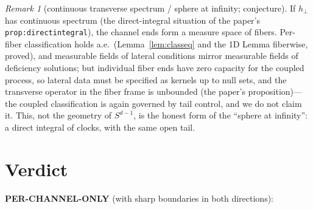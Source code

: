 \documentclass[11pt]{article}
\theoremstyle{remark}
\newtheorem{remark}[theorem]{Remark}
\begin{document}
\begin{remark}[continuous transverse spectrum / sphere at infinity;
conjecture]
If $h_{\perp}$ has continuous spectrum (the direct-integral situation
of the paper's \texttt{prop:directintegral}), the channel ends form a
measure space of fibers.  Per-fiber classification holds a.e.\
(Lemma~\ref{lem:classeq} and the 1D Lemma fiberwise, proved), and
measurable fields of lateral conditions mirror measurable fields of
deficiency solutions; but individual fiber ends have zero capacity for
the coupled process, so lateral data must be specified as kernels up to
null sets, and the transverse operator in the fiber frame is unbounded
(the paper's proposition)---the coupled classification is again
governed by tail control, and we do not claim it.  This, not the
geometry of $S^{d-1}$, is the honest form of the ``sphere at
infinity'': a direct integral of clocks, with the same open tail.
\end{remark}

\section*{Verdict}

\textbf{PER-CHANNEL-ONLY} (with sharp boundaries in both directions):
\end{document}
